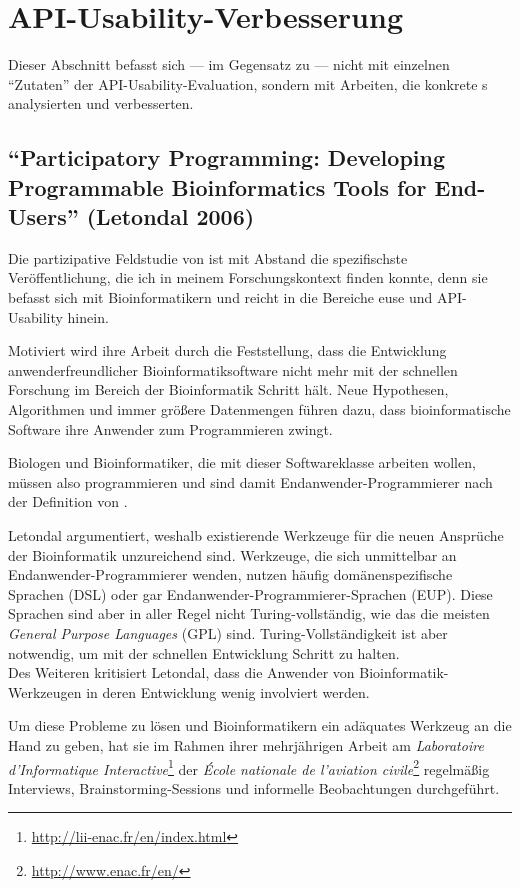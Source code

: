 \section{API-Usability-Verbesserung}
\label{sec:api-research}

Dieser Abschnitt befasst sich --- im Gegensatz zu  --- nicht mit einzelnen ``Zutaten'' der API-Usability-Evaluation, sondern mit Arbeiten, die konkrete s analysierten und verbesserten.


\subsection{``Participatory Programming: Developing Programmable Bioinformatics Tools for End-Users'' (Letondal 2006)}
\label{sec:letondal}

Die partizipative Feldstudie von \cite{Letondal:2006dy} ist mit Abstand die spezifischste Veröffentlichung, die ich in meinem Forschungskontext finden konnte, denn sie befasst sich mit Bioinformatikern und reicht in die Bereiche \gls{euse} und API-Usability hinein.

Motiviert wird ihre Arbeit durch die Feststellung, dass die Entwicklung anwenderfreundlicher Bioinformatiksoftware nicht mehr mit der schnellen Forschung im Bereich der Bioinformatik Schritt hält. Neue Hypothesen, Algorithmen und immer größere Datenmengen führen dazu, dass bioinformatische Software ihre Anwender zum Programmieren zwingt.

Biologen und Bioinformatiker, die mit dieser Softwareklasse arbeiten wollen, müssen also programmieren und sind damit Endanwender-Programmierer nach der Definition von \cite{Ko:2011el}.
 
Letondal argumentiert, weshalb existierende Werkzeuge für die neuen Ansprüche der Bioinformatik unzureichend sind.
Werkzeuge, die sich unmittelbar an Endanwender-Programmierer wenden, nutzen häufig domänenspezifische Sprachen (DSL) oder gar Endanwender-Programmierer-Sprachen (EUP). Diese Sprachen sind aber in aller Regel nicht Turing-vollständig, wie das die meisten \textit{General Purpose Languages} (GPL) sind. Turing-Vollständigkeit ist aber notwendig, um mit der schnellen Entwicklung Schritt zu halten.
\\Des Weiteren kritisiert Letondal, dass die Anwender von Bioinformatik-Werkzeugen in deren Entwicklung wenig involviert werden.

Um diese Probleme zu lösen und Bioinformatikern ein adäquates Werkzeug an die Hand zu geben, hat sie im Rahmen ihrer mehrjährigen Arbeit am \textit{Laboratoire d'Informatique Interactive}\footnote{\url{http://lii-enac.fr/en/index.html}} der \textit{École nationale de l'aviation civile}\footnote{\url{http://www.enac.fr/en/}} regelmäßig Interviews, Brainstorming-Sessions und informelle Beobachtungen durchgeführt.

